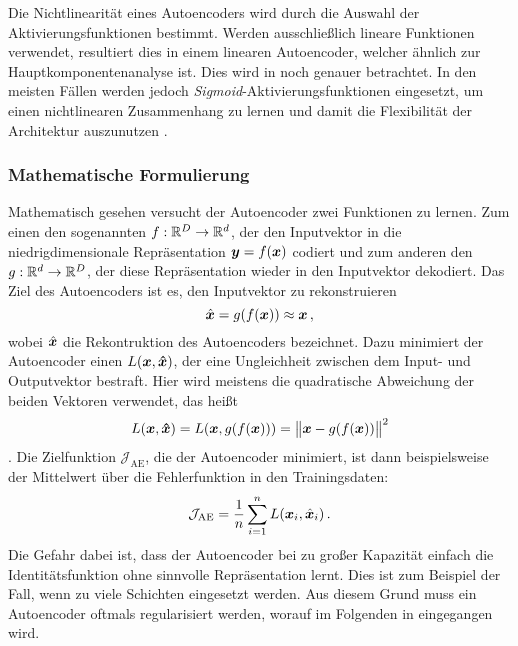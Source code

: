 Die Nichtlinearität eines Autoencoders wird durch die Auswahl der Aktivierungsfunktionen bestimmt.
Werden ausschließlich lineare Funktionen verwendet, resultiert dies in einem linearen Autoencoder,
welcher ähnlich zur Hauptkomponentenanalyse ist. Dies wird in
 noch genauer betrachtet. In den meisten Fällen werden
jedoch \textit{Sigmoid}-Aktivierungsfunktionen eingesetzt, um einen nichtlinearen Zusammenhang zu
lernen und damit die Flexibilität der Architektur auszunutzen \parencite[4]{Charte.2018}.

\subsubsection{Mathematische Formulierung}
\label{ch:MethodenDerDimRed:ML:AE:MathematischeFormulierung}
Mathematisch gesehen versucht der Autoencoder zwei Funktionen zu lernen. Zum einen den sogenannten  $f: \mathbb{R}^D \rightarrow \mathbb{R}^d$, der den Inputvektor in die niedrigdimensionale Repräsentation $\bm{y} = f(\bm{x})$ codiert und zum anderen den  $g: \mathbb{R}^d \rightarrow \mathbb{R}^D$, der diese Repräsentation wieder in den Inputvektor dekodiert. Das Ziel des Autoencoders ist es, den Inputvektor zu rekonstruieren
\begin{equation}
	\hat{\bm{x}} = g(f(\bm{x})) \approx \bm{x} \, ,
\end{equation}
wobei $\hat{\bm{x}}$ die Rekontruktion des Autoencoders bezeichnet.
Dazu minimiert der Autoencoder einen  $L(\bm{x}, \bm{\hat{x}})$, der eine Ungleichheit zwischen dem Input- und Outputvektor bestraft. Hier wird meistens die quadratische Abweichung der beiden Vektoren verwendet, das heißt
\begin{equation}
	\label{eq:MSE_loss}
	L(\vect{x}, \vect{\estNormal{x}}) = L(\vect{x}, g(f(\vect{x}))) = \norm[\big]{\vect{x} - g(f(\vect{x}))}^2
\end{equation}
\parencite[507]{Goodfellow.2016}. Die Zielfunktion $\mathcal{J}_{\text{AE}}$, die der Autoencoder
minimiert, ist dann beispielsweise der Mittelwert über die Fehlerfunktion in den Trainingsdaten:
\begin{equation}
	\label{eq:AE_objectiveFunction}
	\mathcal{J}_{\text{AE}} = \frac{1}{n} \sum_{i = 1}^n L(\vect{x}_i, \estNormal{\vect{x}}_i) \, .
\end{equation}
Die Gefahr dabei ist, dass der Autoencoder bei zu großer Kapazität einfach die Identitätsfunktion
ohne sinnvolle Repräsentation lernt. Dies ist zum Beispiel der Fall, wenn zu viele Schichten
eingesetzt werden. Aus diesem
Grund muss ein Autoencoder oftmals regularisiert werden, worauf im Folgenden in
 eingegangen wird.

